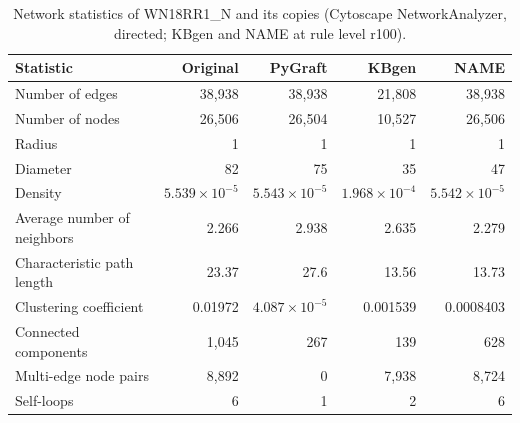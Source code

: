 \begin{table}[t]
\centering
\caption{Network statistics of WN18RR1\_N and its copies (Cytoscape NetworkAnalyzer, directed; KBgen and NAME at rule level r100).}
\label{tab:cytoscape_WN18RR1_N}
\begin{tabular}{lrrrr}
\toprule
Statistic & Original & PyGraft & KBgen & NAME \\
\midrule
Number of edges & 38{,}938 & 38{,}938 & 21{,}808 & 38{,}938 \\
Number of nodes & 26{,}506 & 26{,}504 & 10{,}527 & 26{,}506 \\
Radius & 1 & 1 & 1 & 1 \\
Diameter & 82 & 75 & 35 & 47 \\
Density & $5.539\times10^{-5}$ & $5.543\times10^{-5}$ & $1.968\times10^{-4}$ & $5.542\times10^{-5}$ \\
Average number of neighbors & 2.266 & 2.938 & 2.635 & 2.279 \\
Characteristic path length & 23.37 & 27.6 & 13.56 & 13.73 \\
Clustering coefficient & 0.01972 & $4.087\times10^{-5}$ & 0.001539 & 0.0008403 \\
Connected components & 1{,}045 & 267 & 139 & 628 \\
Multi-edge node pairs & 8{,}892 & 0 & 7{,}938 & 8{,}724 \\
Self-loops & 6 & 1 & 2 & 6 \\
\bottomrule
\end{tabular}
\end{table}

